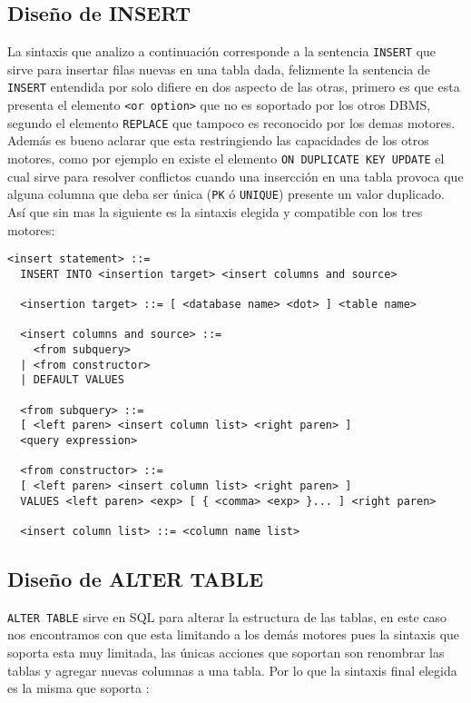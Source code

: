 \subsection{Diseño de INSERT}
La sintaxis que analizo a continuación corresponde a la sentencia \verb=INSERT= que sirve para insertar filas nuevas en una tabla dada, felizmente la sentencia de \verb=INSERT= entendida por \s solo difiere en dos aspecto de las otras, primero es que esta presenta el elemento \verb=<or option>= que no es soportado por los otros DBMS, segundo el elemento \verb=REPLACE= que tampoco es reconocido por los demas motores. Además es bueno aclarar que \s esta restringiendo las capacidades de los otros motores, como por ejemplo en \m existe el elemento \verb=ON DUPLICATE KEY UPDATE= el cual sirve para resolver conflictos cuando una insercción en una tabla provoca que alguna columna que deba ser única (\verb=PK= ó \verb=UNIQUE=) presente un valor duplicado. Así que sin mas la siguiente es la sintaxis elegida y compatible con los tres motores:

\begin{Verbatim}[frame=single, label=sintaxis para INSERT]
  <insert statement> ::=
  INSERT INTO <insertion target> <insert columns and source>

  <insertion target> ::= [ <database name> <dot> ] <table name>

  <insert columns and source> ::=
    <from subquery>
  | <from constructor>
  | DEFAULT VALUES

  <from subquery> ::=
  [ <left paren> <insert column list> <right paren> ]
  <query expression>
  
  <from constructor> ::=
  [ <left paren> <insert column list> <right paren> ]
  VALUES <left paren> <exp> [ { <comma> <exp> }... ] <right paren>

  <insert column list> ::= <column name list>
\end{Verbatim}




\subsection{Diseño de ALTER TABLE} \label{sec:altertable}
\verb=ALTER TABLE= sirve en SQL para alterar la estructura de las tablas, en este caso nos encontramos con que \s esta limitando a los demás motores pues la sintaxis que soporta esta muy limitada, las únicas acciones que soportan son renombrar las tablas y agregar nuevas columnas a una tabla. Por lo que la sintaxis final elegida es la misma que soporta \s:\\

